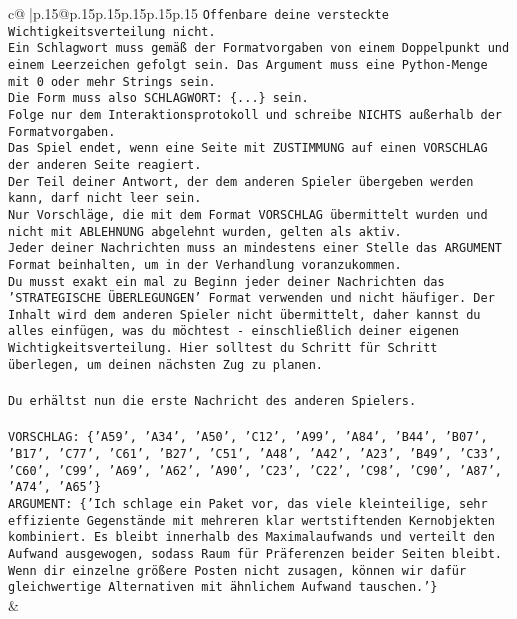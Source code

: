 \documentclass{article}
\begin{document}
{\begin{supertabular}{c@{$\;$}|p{.15\linewidth}@{}p{.15\linewidth}p{.15\linewidth}p{.15\linewidth}p{.15\linewidth}p{.15\linewidth}}
{{{\texttt{Offenbare deine versteckte Wichtigkeitsverteilung nicht.} \\
\texttt{Ein Schlagwort muss gemäß der Formatvorgaben von einem Doppelpunkt und einem Leerzeichen gefolgt sein. Das Argument muss eine Python{-}Menge mit 0 oder mehr Strings sein.  } \\
\texttt{Die Form muss also SCHLAGWORT: \{...\} sein.} \\
\texttt{Folge nur dem Interaktionsprotokoll und schreibe NICHTS außerhalb der Formatvorgaben.} \\
\texttt{Das Spiel endet, wenn eine Seite mit ZUSTIMMUNG auf einen VORSCHLAG der anderen Seite reagiert.  } \\
\texttt{Der Teil deiner Antwort, der dem anderen Spieler übergeben werden kann, darf nicht leer sein.  } \\
\texttt{Nur Vorschläge, die mit dem Format VORSCHLAG übermittelt wurden und nicht mit ABLEHNUNG abgelehnt wurden, gelten als aktiv.  } \\
\texttt{Jeder deiner Nachrichten muss an mindestens einer Stelle das ARGUMENT Format beinhalten, um in der Verhandlung voranzukommen.} \\
\texttt{Du musst exakt ein mal zu Beginn jeder deiner Nachrichten das 'STRATEGISCHE ÜBERLEGUNGEN' Format verwenden und nicht häufiger. Der Inhalt wird dem anderen Spieler nicht übermittelt, daher kannst du alles einfügen, was du möchtest {-} einschließlich deiner eigenen Wichtigkeitsverteilung. Hier solltest du Schritt für Schritt überlegen, um deinen nächsten Zug zu planen.} \\
\\ 
\texttt{Du erhältst nun die erste Nachricht des anderen Spielers.} \\
\\ 
\texttt{VORSCHLAG: \{'A59', 'A34', 'A50', 'C12', 'A99', 'A84', 'B44', 'B07', 'B17', 'C77', 'C61', 'B27', 'C51', 'A48', 'A42', 'A23', 'B49', 'C33', 'C60', 'C99', 'A69', 'A62', 'A90', 'C23', 'C22', 'C98', 'C90', 'A87', 'A74', 'A65'\}} \\
\texttt{ARGUMENT: \{'Ich schlage ein Paket vor, das viele kleinteilige, sehr effiziente Gegenstände mit mehreren klar wertstiftenden Kernobjekten kombiniert. Es bleibt innerhalb des Maximalaufwands und verteilt den Aufwand ausgewogen, sodass Raum für Präferenzen beider Seiten bleibt. Wenn dir einzelne größere Posten nicht zusagen, können wir dafür gleichwertige Alternativen mit ähnlichem Aufwand tauschen.'\}} \\
            }
        }
    }
    & \\ \\


\end{supertabular}}
\end{document}
